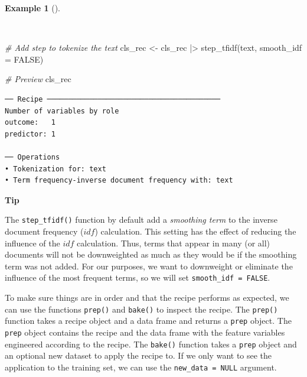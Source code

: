 \documentclass[
  letterpaper,
  krantz1]{latex/krantz-mod}
\newenvironment{Shaded}{\begin{snugshade}}{\end{snugshade}}
\newcommand{\AttributeTok}[1]{\textcolor[rgb]{0.00,0.00,0.00}{#1}}
\newcommand{\CommentTok}[1]{\textcolor[rgb]{0.00,0.00,0.00}{\textit{#1}}}
\newcommand{\ConstantTok}[1]{\textcolor[rgb]{0.00,0.00,0.00}{#1}}
\newcommand{\FunctionTok}[1]{\textcolor[rgb]{0.00,0.00,0.00}{#1}}
\newcommand{\NormalTok}[1]{\textcolor[rgb]{0.00,0.00,0.00}{#1}}
\newcommand{\OtherTok}[1]{\textcolor[rgb]{0.00,0.00,0.00}{#1}}
\newcommand{\SpecialCharTok}[1]{\textcolor[rgb]{0.00,0.00,0.00}{#1}}
\theoremstyle{definition}
\newtheorem{example}{Example}[chapter]
\theoremstyle{definition}
\theoremstyle{remark}
\begin{document}
\begin{example}[]\protect\hypertarget{exm-predict-class-recipe-tfidf}{}\label{exm-predict-class-recipe-tfidf}

~

\begin{Shaded}
\begin{Highlighting}[numbers=left,,]
\CommentTok{\# Add step to tokenize the text}
\NormalTok{cls\_rec }\OtherTok{\textless{}{-}}
\NormalTok{  cls\_rec }\SpecialCharTok{|\textgreater{}}
  \FunctionTok{step\_tfidf}\NormalTok{(text, }\AttributeTok{smooth\_idf =} \ConstantTok{FALSE}\NormalTok{)}

\CommentTok{\# Preview}
\NormalTok{cls\_rec}
\end{Highlighting}
\end{Shaded}

\begin{verbatim}
── Recipe ─────────────────────────────────────────
Number of variables by role
outcome:   1
predictor: 1

── Operations
• Tokenization for: text
• Term frequency-inverse document frequency with: text
\end{verbatim}

\end{example}

\pagebreak

\begin{tcolorbox}[enhanced jigsaw, leftrule=.75mm, colframe=quarto-callout-color-frame, left=2mm, colback=white, toprule=.15mm, breakable, arc=.35mm, opacityback=0, bottomrule=.15mm, rightrule=.15mm]

\textbf{ Tip}

The \texttt{step\_tfidf()} function by default add a \emph{smoothing
term} to the inverse document frequency (\(idf\)) calculation. This
setting has the effect of reducing the influence of the \(idf\)
calculation. Thus, terms that appear in many (or all) documents will not
be downweighted as much as they would be if the smoothing term was not
added. For our purposes, we want to downweight or eliminate the
influence of the most frequent terms, so we will set
\texttt{smooth\_idf\ =\ FALSE}.

\end{tcolorbox}

To make sure things are in order and that the recipe performs as
expected, we can use the functions \texttt{prep()} and \texttt{bake()}
to inspect the recipe. The \texttt{prep()} function takes a recipe
object and a data frame and returns a \texttt{prep} object. The
\texttt{prep} object contains the recipe and the data frame with the
feature variables engineered according to the recipe. The
\texttt{bake()} function takes a \texttt{prep} object and an optional
new dataset to apply the recipe to. If we only want to see the
application to the training set, we can use the
\texttt{new\_data\ =\ NULL} argument.
\end{document}

